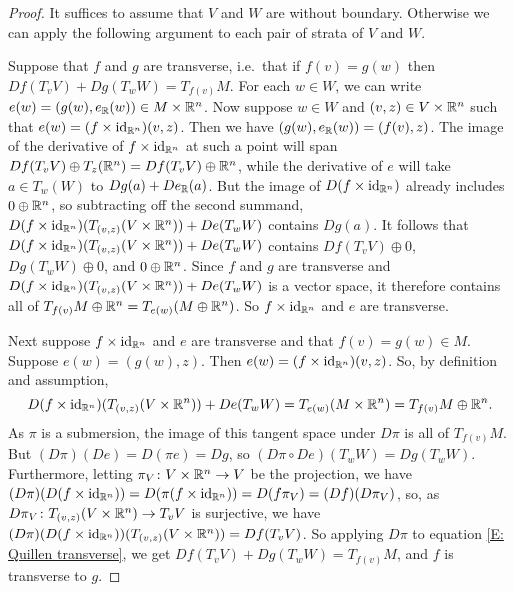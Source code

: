 \begin{proof}
	It suffices to assume that $V$ and $W$ are without boundary.
	Otherwise we can apply the following argument to each pair of strata of $V$ and $W$.

	Suppose that $f$ and $g$ are transverse, i.e.\ that if $f(v) = g(w)$ then $Df(T_vV)+Dg(T_wW) = T_{f(v)}M$.
	For each $w \in W$, we can write $e(w) = (g(w),e_{\mathbb{R}}(w)) \in M \times \mathbb{R}^n$.
	Now suppose $w \in W$ and $(v,z) \in V \times \mathbb{R}^n$ such that $e(w) = (f \times \mathrm{id}_{\mathbb{R}^n})(v,z)$.
	Then we have $(g(w),e_{\mathbb{R}}(w)) = (f(v),z)$.
	The image of the derivative of $f \times \mathrm{id}_{\mathbb{R}^n}$ at such a point will span $Df(T_vV) \oplus T_z(\mathbb{R}^{n}) = Df(T_vV) \oplus \mathbb{R}^{n}$, while the derivative of $e$ will take $a \in T_w(W)$ to $Dg(a)+ De_{\mathbb{R}}(a)$.
	But the image of $D(f \times \mathrm{id}_{\mathbb{R}^n})$ already includes $0 \oplus \mathbb{R}^{n}$, so subtracting off the second summand, $D(f \times \mathrm{id}_{\mathbb{R}^{n}})(T_{(v,z)}(V \times \mathbb{R}^n))+De(T_wW)$ contains $Dg(a)$.
	It follows that $D(f \times \mathrm{id}_{\mathbb{R}^{n}})(T_{(v,z)}(V \times \mathbb{R}^n))+De(T_wW)$ contains $Df(T_vV) \oplus 0$, $Dg(T_wW) \oplus 0$, and $0 \oplus \mathbb{R}^n$.
	Since $f$ and $g$ are transverse and $D(f \times \mathrm{id}_{\mathbb{R}^{n}})(T_{(v,z)}(V \times \mathbb{R}^n))+De(T_wW)$ is a vector space, it therefore contains all of $T_{f(v)}M \oplus \mathbb{R}^n = T_{e(w)}(M \oplus \mathbb{R}^n)$.
	So $f \times \mathrm{id}_{\mathbb{R}^n}$ and $e$ are transverse.

	Next suppose $f \times \mathrm{id}_{\mathbb{R}^n}$ and $e$ are transverse and that $f(v) = g(w) \in M$.
	Suppose $e(w) = (g(w),z)$.
	Then $e(w) = (f \times \mathrm{id}_{\mathbb{R}^n})(v,z)$.
	So, by definition and assumption,
	\begin{equation}\label{E: Quillen transverse}
		D(f \times \mathrm{id}_{\mathbb{R}^{n}})(T_{(v,z)}(V \times \mathbb{R}^n))+De(T_wW) = T_{e(w)}(M \times \mathbb{R}^n) = T_{f(v)}M \oplus \mathbb{R}^n.
	\end{equation}
	As $\pi$ is a submersion, the image of this tangent space under $D\pi$ is all of $T_{f(v)}M$.
	But $(D\pi)(De) = D(\pi e) = Dg$, so $(D\pi \circ De)(T_wW) = Dg(T_wW)$.
	Furthermore, letting $\pi_V \colon V \times \mathbb{R}^n \to V$ be the projection, we have $(D\pi)(D(f \times \mathrm{id}_{\mathbb{R}^{n}})) = D(\pi(f \times \mathrm{id}_{\mathbb{R}^{n}})) = D(f\pi_V) = (Df)(D\pi_V)$, so, as $D\pi_V \colon T_{(v,z)}(V \times \mathbb{R}^n) \to T_vV$ is surjective, we have $(D\pi)(D(f \times \mathrm{id}_{\mathbb{R}^{n}}))(T_{(v,z)}(V \times \mathbb{R}^n)) = Df(T_vV)$.
	So applying $D\pi$ to equation \eqref{E: Quillen transverse}, we get $Df(T_vV)+Dg(T_wW) = T_{f(v)}M$, and $f$ is transverse to $g$.
\end{proof}

